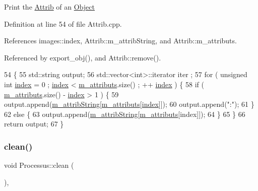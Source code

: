 Print the \hyperlink{classAttrib}{Attrib} of an \hyperlink{classObject}{Object} 

Definition at line 54 of file Attrib.\+cpp.



References images\+::index, Attrib\+::m\+\_\+attrib\+String, and Attrib\+::m\+\_\+attributs.



Referenced by export\+\_\+obj(), and Attrib\+::remove().


\begin{DoxyCode}
54                             \{
55   std::string output;
56   std::vector<int>::iterator iter ;
57   \textcolor{keywordflow}{for} ( \textcolor{keywordtype}{unsigned} \textcolor{keywordtype}{int} \hyperlink{namespaceimages_a54407fd574970b3178647ae096321a57}{index} = 0 ; \hyperlink{namespaceimages_a54407fd574970b3178647ae096321a57}{index} < \hyperlink{classAttrib_ac4bd58a0cc6b38a3b711d609a3d3aacc}{m\_attributs}.size() ; ++
      \hyperlink{namespaceimages_a54407fd574970b3178647ae096321a57}{index} ) \{
58     \textcolor{keywordflow}{if} ( \hyperlink{classAttrib_ac4bd58a0cc6b38a3b711d609a3d3aacc}{m\_attributs}.size() - \hyperlink{namespaceimages_a54407fd574970b3178647ae096321a57}{index} > 1 ) \{
59       output.append(\hyperlink{classAttrib_a3414521d7a82476e874b25a5407b5e63}{m\_attribString}[\hyperlink{classAttrib_ac4bd58a0cc6b38a3b711d609a3d3aacc}{m\_attributs}[\hyperlink{namespaceimages_a54407fd574970b3178647ae096321a57}{index}]]);
60       output.append(\textcolor{stringliteral}{":"});
61     \}
62     \textcolor{keywordflow}{else} \{
63       output.append(\hyperlink{classAttrib_a3414521d7a82476e874b25a5407b5e63}{m\_attribString}[\hyperlink{classAttrib_ac4bd58a0cc6b38a3b711d609a3d3aacc}{m\_attributs}[index]]);
64     \}
65   \}
66   \textcolor{keywordflow}{return} output;
67 \}
\end{DoxyCode}
\mbox{\label{classProcessus_aaeb17673b98d2b39f3aa780e335e0968}} 
\subsubsection{\texorpdfstring{clean()}{clean()}}
{\footnotesize\ttfamily void Processus\+::clean (\begin{DoxyParamCaption}{ }\end{DoxyParamCaption})\hspace{0.3cm}{\ttfamily [inline]}, {\ttfamily [inherited]}}



